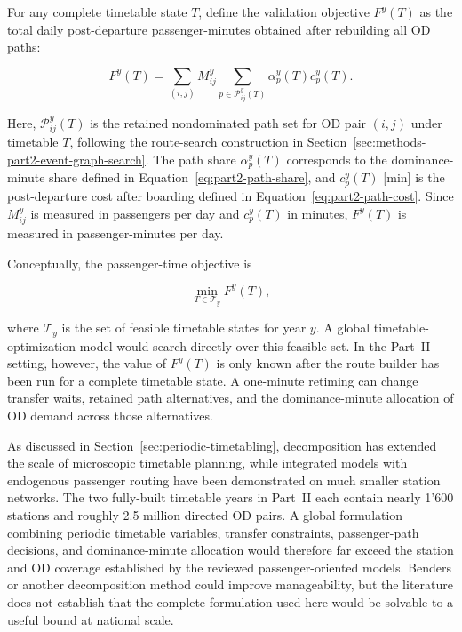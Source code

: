 \documentclass[preprint,12pt]{elsarticle}
\begin{document}
For any complete timetable state \(T\), define the validation objective \(F^y(T)\) as the total daily post-departure passenger-minutes obtained after rebuilding all OD paths:

\begin{equation}
  F^y(T)
  =
  \sum_{(i,j)}
  M^y_{ij}
  \sum_{p\in\mathcal{P}_{ij}^{y}(T)}
  \alpha_p^y(T)c_p^y(T).
  \label{eq:part2-validation-objective-intro}
\end{equation}

Here, \(\mathcal{P}_{ij}^{y}(T)\) is the retained nondominated path set for OD pair \((i,j)\) under timetable \(T\), following the route-search construction in Section~\ref{sec:methods-part2-event-graph-search}. The path share \(\alpha_p^y(T)\) corresponds to the dominance-minute share defined in Equation~\eqref{eq:part2-path-share}, and \(c_p^y(T)\) [min] is the post-departure cost after boarding defined in Equation~\eqref{eq:part2-path-cost}. Since \(M^y_{ij}\) is measured in passengers per day and \(c_p^y(T)\) in minutes, \(F^y(T)\) is measured in passenger-minutes per day.

Conceptually, the passenger-time objective is

\[
  \min_{T\in\mathcal{T}_y} F^y(T),
\]

where \(\mathcal{T}_y\) is the set of feasible timetable states for year \(y\). A global timetable-optimization model would search directly over this feasible set. In the Part~II setting, however, the value of \(F^y(T)\) is only known after the route builder has been run for a complete timetable state. A one-minute retiming can change transfer waits, retained path alternatives, and the dominance-minute allocation of OD demand across those alternatives.

As discussed in Section~\ref{sec:periodic-timetabling}, decomposition has extended the scale of microscopic timetable planning, while integrated models with endogenous passenger routing have been demonstrated on much smaller station networks. The two fully-built timetable years in Part~II each contain nearly 1'600 stations and roughly 2.5 million directed OD pairs. A global formulation combining periodic timetable variables, transfer constraints, passenger-path decisions, and dominance-minute allocation would therefore far exceed the station and OD coverage established by the reviewed passenger-oriented models. Benders or another decomposition method could improve manageability, but the literature does not establish that the complete formulation used here would be solvable to a useful bound at national scale.
\end{document}
